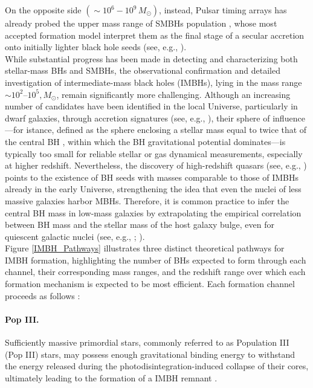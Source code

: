 \documentclass[12pt,twoside,openany]{book}
\begin{document}
On the opposite side $(\sim 10^6-10^9\,M_\odot)$, instead, Pulsar timing arrays has already probed the upper mass range of SMBHs population \parencite{Taylor_2021}, whose most accepted formation model interpret them as the final stage of a secular accretion onto initially lighter black hole seeds (see, e.g., \citealt{Peterson_book}).\\While substantial progress has been made in detecting and characterizing both stellar-mass BHs and SMBHs, the observational confirmation and detailed investigation of intermediate-mass black holes (IMBHs), lying in the mass range $\sim 10^2$--$10^5,M_\odot$, remain significantly more challenging. Although an increasing number of candidates have been identified in the local Universe, particularly in dwarf galaxies, through accretion signatures (see, e.g., \citealt{Reines_2013}), their sphere of influence—for istance, defined as the sphere enclosing a stellar mass equal to twice that of the central BH \parencite{Sesana_2015}, within which the BH gravitational potential dominates—is typically too small for reliable stellar or gas dynamical measurements, especially at higher redshift. Nevertheless, the discovery of high-redshift quasars (see, e.g., \citealt{Banados_2018}) points to the existence of BH seeds with masses comparable to those of IMBHs already in the early Universe, strengthening the idea that even the nuclei of less massive galaxies harbor MBHs. Therefore, it is common practice to infer the central BH mass in low-mass galaxies by extrapolating the empirical correlation between BH mass and the stellar mass of the host galaxy bulge, even for quiescent galactic nuclei (see, e.g., \citealt{Schutte_2019}; \citealt{Maiolino_2024}).\\Figure \ref{IMBH_Pathways} illustrates three distinct theoretical pathways for IMBH formation, highlighting the number of BHs expected to form through each channel, their corresponding mass ranges, and the redshift range over which each formation mechanism is expected to be most efficient. Each formation channel proceeds as follows \parencite{Greene_2020}:
\paragraph{Pop III.}
Sufficiently massive primordial stars, commonly referred to as Population III (Pop III) stars, may possess enough gravitational binding energy to withstand the energy released during the photodisintegration-induced collapse of their cores, ultimately leading to the formation of a IMBH remnant \parencite{Fryer_2001}.
\end{document}
